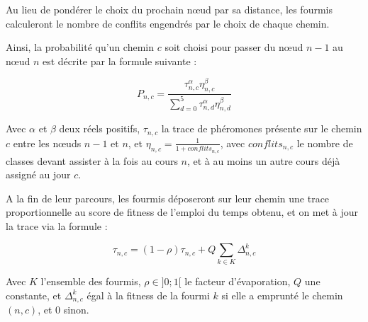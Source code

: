 \begin{center}
\end{center}

Au lieu de pondérer le choix du prochain n\oe ud par sa distance, les fourmis calculeront le nombre de conflits engendrés par le choix de chaque chemin.

Ainsi, la probabilité qu'un chemin $c$ soit choisi pour passer du n\oe ud $n-1$ au n\oe ud $n$ est décrite par la formule suivante :

$$P_{n,c} = \frac{\tau^{\alpha}_{n,c}\eta^{\beta}_{n,c}}{\sum^{5}_{d = 0}{\tau^{\alpha}_{n,d}\eta^{\beta}_{n,d}}}$$

Avec $\alpha$ et $\beta$ deux réels positifs, $\tau_{n,c}$ la trace de phéromones présente sur le chemin $c$ entre les n\oe uds $n-1$ et $n$, et $\eta_{n,c} = \frac{1}{1 + conflits_{n,c}}$, avec $conflits_{n,c}$ le nombre de classes devant assister à la fois au cours $n$, et à au moins un autre cours déjà assigné au jour $c$.

A la fin de leur parcours, les fourmis déposeront sur leur chemin une trace proportionnelle au score de fitness de l'emploi du temps obtenu, et on met à jour la trace via la formule :

$$\tau_{n,c} = (1-\rho)\tau_{n,c} + Q\sum_{k \in K}{\Delta^k_{n,c}}$$

Avec $K$ l'ensemble des fourmis, $\rho \in ]0;1[$ le facteur d'évaporation, $Q$ une constante, et $\Delta^k_{n,c}$ égal à la fitness de la fourmi $k$ si elle a emprunté le chemin $(n,c)$, et $0$ sinon.

